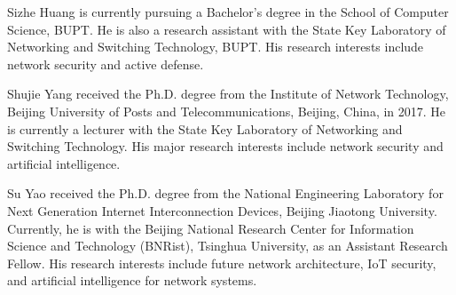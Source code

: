 \documentclass[lettersize,journal]{IEEEtran}
\begin{document}
\vspace{11pt}

\begin{IEEEbiography}{Sizhe Huang} is currently pursuing a Bachelor's degree in the School of Computer Science, BUPT. He is also a research assistant with the State Key Laboratory of Networking and Switching Technology, BUPT. His research interests include network security and active defense.  
\end{IEEEbiography}

\vspace{11pt}



\begin{IEEEbiography}{Shujie Yang} received the Ph.D. degree from the Institute of Network Technology, Beijing University of Posts and Telecommunications, Beijing, China, in 2017. He is currently a lecturer with the State Key Laboratory of Networking and Switching Technology. His major research interests include network security and artificial intelligence.
\end{IEEEbiography}

\begin{IEEEbiography}{Su Yao} received the Ph.D. degree from the National Engineering Laboratory for Next Generation Internet Interconnection Devices, Beijing Jiaotong University. Currently, he is with the Beijing National Research Center for Information Science and Technology (BNRist), Tsinghua University, as an Assistant Research Fellow. His research interests include future network architecture, IoT security, and artificial intelligence for network systems.
\end{IEEEbiography}

\end{document}
